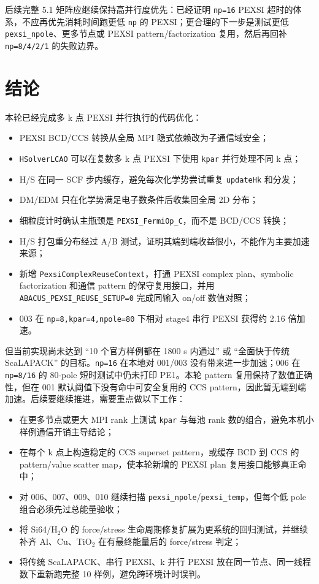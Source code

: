 \documentclass[a4paper,11pt]{article}
\newcommand{\code}[1]{\texttt{#1}}
\begin{document}
后续完整 5.1 矩阵应继续保持高并行度优先：已经证明 \code{np=16} PEXSI 超时的体系，不应再优先消耗时间跑更低 \code{np} 的 PEXSI；更合理的下一步是测试更低 \code{pexsi\_npole}、更多节点或 PEXSI pattern/factorization 复用，然后再回补 \code{np=8/4/2/1} 的失败边界。

\section{结论}

本轮已经完成多 k 点 PEXSI 并行执行的代码优化：

\begin{itemize}
    \item PEXSI BCD/CCS 转换从全局 MPI 隐式依赖改为子通信域安全；
    \item \code{HSolverLCAO} 可以在复数多 k 点 PEXSI 下使用 \code{kpar} 并行处理不同 k 点；
    \item H/S 在同一 SCF 步内缓存，避免每次化学势尝试重复 \code{updateHk} 和分发；
    \item DM/EDM 只在化学势满足电子数条件后收集回全局 2D 分布；
    \item 细粒度计时确认主瓶颈是 \code{PEXSI\_FermiOp\_C}，而不是 BCD/CCS 转换；
    \item H/S 打包重分布经过 A/B 测试，证明其端到端收益很小，不能作为主要加速来源；
    \item 新增 \code{PexsiComplexReuseContext}，打通 PEXSI complex plan、symbolic factorization 和通信 pattern 的保守复用接口，并用 \code{ABACUS\_PEXSI\_REUSE\_SETUP=0} 完成同输入 on/off 数值对照；
    \item 003 在 \code{np=8,kpar=4,npole=80} 下相对 stage4 串行 PEXSI 获得约 2.16 倍加速。
\end{itemize}

但当前实现尚未达到 ``10 个官方样例都在 1800 s 内通过'' 或 ``全面快于传统 ScaLAPACK'' 的目标。\code{np=16} 在本地对 001/003 没有带来进一步加速；006 在 \code{np=8/16} 的 80-pole 短时测试中仍未打印 PE1。本轮 pattern 复用保持了数值正确性，但在 001 默认阈值下没有命中可安全复用的 CCS pattern，因此暂无端到端加速。后续要继续推进，需要重点做以下工作：

\begin{itemize}
    \item 在更多节点或更大 MPI rank 上测试 \code{kpar} 与每池 rank 数的组合，避免本机小样例通信开销主导结论；
    \item 在每个 k 点上构造稳定的 CCS superset pattern，或缓存 BCD 到 CCS 的 pattern/value scatter map，使本轮新增的 PEXSI plan 复用接口能够真正命中；
    \item 对 006、007、009、010 继续扫描 \code{pexsi\_npole}/\code{pexsi\_temp}，但每个低 pole 组合必须先过总能量验收；
    \item 将 Si64/H\(_2\)O 的 force/stress 生命周期修复扩展为更系统的回归测试，并继续补齐 Al、Cu、TiO\(_2\) 在有最终能量后的 force/stress 判定；
    \item 将传统 ScaLAPACK、串行 PEXSI、k 并行 PEXSI 放在同一节点、同一线程数下重新跑完整 10 样例，避免跨环境计时误判。
\end{itemize}
\end{document}
